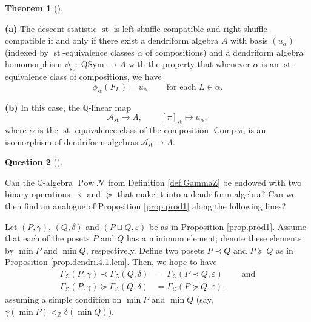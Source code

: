 \documentclass[numbers=enddot,12pt,final,onecolumn,notitlepage]{scrartcl}%
\theoremstyle{definition}
\newtheorem{theo}{Theorem}[section]
\newenvironment{theorem}[1][]
{\begin{theo}[#1]\begin{leftbar}}
{\end{leftbar}\end{theo}}
\newtheorem{quest}[theo]{Question}
\newenvironment{question}[1][]
{\begin{quest}[#1]\begin{leftbar}}
{\end{leftbar}\end{quest}}
\newenvironment{question}[1][Question]{\noindent\textbf{#1.} }{\ \rule{0.5em}{0.5em}}
\newenvironment{verlong}{}{}
\newcommand{\ZZ}{\mathbb{Z}}
\begin{document}
\begin{verlong}
\begin{theorem}
\textbf{(a)} The descent statistic $\operatorname{st}$ is
left-shuffle-compatible and right-shuffle-compatible if and only if there
exist a dendriform algebra $A$ with
basis $\left(  u_{\alpha}\right)  $ (indexed by $\operatorname{st}%
$-equivalence classes $\alpha$ of compositions)
and a dendriform algebra homomorphism
$\phi_{\operatorname{st}}:\operatorname*{QSym} \rightarrow A$
with the property that whenever $\alpha$ is an
$\operatorname{st}$-equivalence class of compositions, we have
\[
\phi_{\operatorname{st}}\left(  F_{L}\right)  =u_{\alpha}%
\ \ \ \ \ \ \ \ \ \ \text{for each }L\in\alpha.
\]

\textbf{(b)} In this case, the $\mathbb{Q}$-linear map%
\[
\mathcal{A}_{\operatorname{st}}\rightarrow A,\ \ \ \ \ \ \ \ \ \ \left[
\pi\right]  _{\operatorname{st}}\mapsto u_{\alpha},
\]
where $\alpha$ is the $\operatorname{st}$-equivalence class of the
composition $\operatorname*{Comp}\pi$, is an isomorphism of dendriform
algebras $\mathcal{A}_{\operatorname{st}}\rightarrow A$.
\end{theorem}

\begin{question}
Can the $\mathbb{Q}$-algebra $\operatorname*{Pow}\mathcal{N}$ from Definition
\ref{def.GammaZ} be endowed with two binary operations $\left.  \prec\right.
$ and $\left.  \succeq\right.  $ that make it into a dendriform algebra? Can
we then find an analogue of Proposition \ref{prop.prod1} along the following lines?

Let $\left(  P,\gamma\right)  $, $\left(  Q,\delta\right)  $ and $\left(
P\sqcup Q,\varepsilon\right)  $ be as in Proposition \ref{prop.prod1}. Assume
that each of the posets $P$ and $Q$ has a minimum element; denote these
elements by $\min P$ and $\min Q$, respectively. Define two posets $P\left.
\prec\right.  Q$ and $P\left.  \succeq\right.  Q$ as in Proposition
\ref{prop.dendri.4.1.lem}. Then, we hope to have%
\begin{align*}
\Gamma_{\mathcal{Z}}\left(  P,\gamma\right)  \left.  \prec\right.
\Gamma_{\mathcal{Z}}\left(  Q,\delta\right)   &  =\Gamma_{\mathcal{Z}}\left(
P\left.  \prec\right.  Q,\varepsilon\right)  \ \ \ \ \ \ \ \ \ \ \text{and}\\
\Gamma_{\mathcal{Z}}\left(  P,\gamma\right)  \left.  \succeq\right.
\Gamma_{\mathcal{Z}}\left(  Q,\delta\right)   &  =\Gamma_{\mathcal{Z}}\left(
P\left.  \succeq\right.  Q,\varepsilon\right) ,
\end{align*}
assuming a simple condition on $\min P$ and $\min Q$
(say, $\gamma\left(\min P\right) <_{\ZZ} \delta\left(\min Q\right)$).


\end{question}
\end{verlong}
\end{document}
